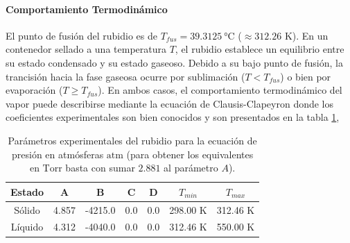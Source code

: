 \paragraph{Comportamiento Termodinámico}
El punto de fusión del rubidio es de $T_{fus} = 39.31 \SI{25}{\degreeCelsius}$ ($\approx 312.26$ K). En un contenedor sellado a una temperatura $T$, el rubidio establece un equilibrio entre su estado condensado y su estado gaseoso. Debido a su bajo punto de fusión, la trancisión hacia la fase gaseosa ocurre por sublimación ($T < T_{fus}$) o bien por evaporación ($T \geq T_{fus}$). En ambos casos, el comportamiento termodinámico del vapor puede describirse mediante la ecuación de Clausis-Clapeyron donde los coeficientes experimentales son bien conocidos y son presentados en la tabla \ref{tab:rb_pressure_params},

\begin{table}[htbp]
  \centering
  \caption{Parámetros experimentales del rubidio para la ecuación de presión en atmósferas $\text{atm}$ (para obtener los equivalentes en $\text{Torr}$ basta con sumar $2.881$ al parámetro $A$).}
    \begin{tabular}{cccccrr}
    \toprule
    \textbf{Estado} &
      \textbf{A } &
      \textbf{B} &
      \textbf{C} &
      \textbf{D} &
      \multicolumn{1}{c}{\boldmath{}\textbf{$T_{min}$}\unboldmath{}} &
      \multicolumn{1}{c}{\boldmath{}\textbf{$T_{max}$}\unboldmath{}}
      \\
    \midrule
    Sólido &
      4.857 &
      -4215.0 &
      0.0 &
      0.0 &
      298.00 K&
      312.46 K
      \\
    \midrule
    Líquido &
      4.312 &
      -4040.0 &
      0.0 &
      0.0 &
      312.46 K&
      550.00 K
      \\
    \bottomrule
    \end{tabular}%
  \label{tab:rb_pressure_params}%
\end{table}%

